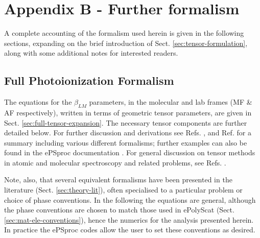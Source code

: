 \documentclass[10pt]{article}
\begin{document}
\section{Appendix B - Further formalism\label{sec:Appendix-B}}

A complete accounting of the formalism used herein is given in the following sections, expanding on the brief introduction of Sect. \ref{sec:tensor-formulation}, along with some additional notes for interested readers.

\subsection{Full Photoionization Formalism \label{appendix:formalism}}


The equations for the \(\beta_{LM}\) parameters, in the molecular and
lab frames (MF \& AF respectively), written in terms of geometric
tensor parameters, are given in Sect. \ref{sec:full-tensor-expansion}. The necessary tensor components are further detailed below. For further discussion and derivations see Refs. \cite{Reid2000,Underwood2000,Stolow2008}, and Ref. \cite{hockett2018QMP1} for a summary including various different formalisms; further examples can also be found in the ePSproc documentation \cite{ePSprocDocs}. For general discussion on tensor methods in atomic and molecular spectroscopy and related problems, see Refs. \cite{BlumDensityMat,zareAngMom}. 

Note, also, that several equivalent formalisms have been presented in the literature (Sect. \ref{sec:theory-lit}), often specialised to a particular problem or choice of phase conventions. In the following the equations are general, although the phase conventions are chosen to match those used in ePolyScat (Sect. \ref{sec:mat-ele-conventions}), hence the numerics for the analysis presented herein. In practice the ePSproc codes allow the user to set these conventions as desired. %


\end{document}
